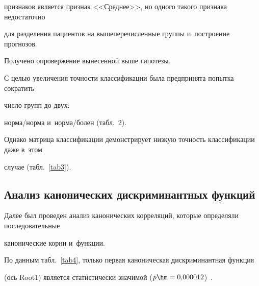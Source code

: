 признаков является признак <<Среднее>>, но одного такого признака недостаточно 

для разделения пациентов на вышеперечисленные группы и~построение прогнозов. 

Получено опровержение вынесенной выше гипотезы.



С целью увеличения точности классификации была предпринята попытка сократить 

число групп до двух:

нор\-ма/нор\-ма и~нор\-ма/бо\-лен (табл.~2).







Однако матрица классификации демонстрирует низкую точность классификации даже в~этом 

случае (табл.~\ref{tab3}).









\subsection{Анализ канонических дискриминантных функций}



Далее был проведен анализ канонических корреляций, которые определяли последовательные 

канонические корни и~функции.





По данным табл.~\ref{tab4}, только первая каноническая дискриминантная функция 

(ось Root1) является статистически значимой ($p \hm= 0{,}000012$)~\cite{borovikov}.



